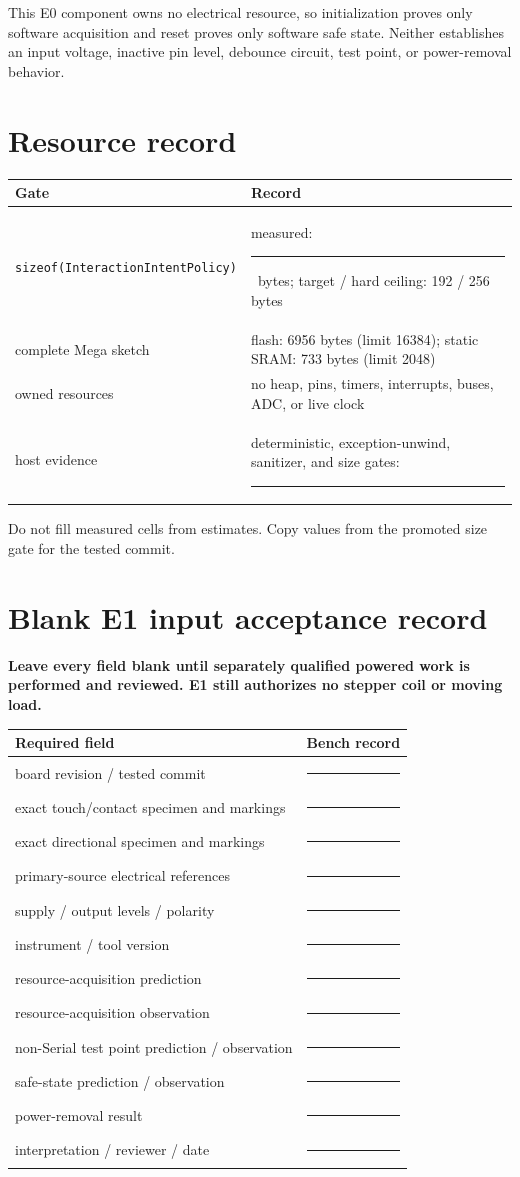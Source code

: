 \documentclass[11pt]{article}
\newcommand{\blankline}{\rule{0.9in}{0.4pt}}
\begin{document}
This E0 component owns no electrical resource, so initialization proves only
software acquisition and reset proves only software safe state. Neither
establishes an input voltage, inactive pin level, debounce circuit, test
point, or power-removal behavior.

\section{Resource record}
\begin{tabularx}{\linewidth}{@{}l X@{}}
\toprule
Gate & Record\\
\midrule
\texttt{sizeof(InteractionIntentPolicy)} & measured: \blankline\ bytes;
target / hard ceiling: 192 / 256 bytes\\[6pt]
complete Mega sketch & flash: 6956 bytes (limit 16384);
static SRAM: 733 bytes (limit 2048)\\[6pt]
owned resources & no heap, pins, timers, interrupts, buses, ADC, or live clock\\
host evidence & deterministic, exception-unwind, sanitizer, and size gates:
\blankline\\
\bottomrule
\end{tabularx}

Do not fill measured cells from estimates. Copy values from the promoted size
gate for the tested commit.

\newpage
\small
\section{Blank E1 input acceptance record}
\textbf{Leave every field blank until separately qualified powered work is
performed and reviewed. E1 still authorizes no stepper coil or moving load.}

\begin{tabularx}{\linewidth}{@{}l X@{}}
\toprule
Required field & Bench record\\
\midrule
board revision / tested commit & \blankline\\[6pt]
exact touch/contact specimen and markings & \blankline\\[6pt]
exact directional specimen and markings & \blankline\\[6pt]
primary-source electrical references & \blankline\\[6pt]
supply / output levels / polarity & \blankline\\[6pt]
instrument / tool version & \blankline\\[6pt]
resource-acquisition prediction & \blankline\\[6pt]
resource-acquisition observation & \blankline\\[6pt]
non-Serial test point prediction / observation & \blankline\\[6pt]
safe-state prediction / observation & \blankline\\[6pt]
power-removal result & \blankline\\[6pt]
interpretation / reviewer / date & \blankline\\
\bottomrule
\end{tabularx}
\end{document}
